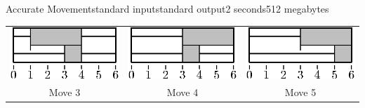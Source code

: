 \begin{problem}{Accurate Movement}{standard input}{standard output}{2 seconds}{512 megabytes}
\begin{center}
\begin{tabular}{ccc}
\includegraphics{bars-6.ps} & \includegraphics{bars-7.ps} & \includegraphics{bars-3.ps} \\
Move 3                      & Move 4                      & Move 5\\
\end{tabular}
\end{center}


\end{problem}

